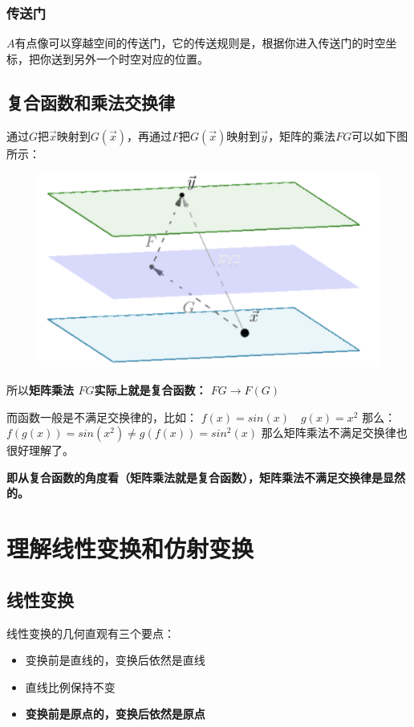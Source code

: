 \documentclass[12pt]{article}
\begin{document}
\subsubsection{传送门}
$A$有点像可以穿越空间的传送门，它的传送规则是，根据你进入传送门的时空坐标，把你送到另外一个时空对应的位置。

\subsection{复合函数和乘法交换律}
通过$G$把$\vec{x}$映射到$G(\vec{x})$，再通过$F$把$G(\vec{x})$映射到$\vec{y}$，矩阵的乘法$FG$可以如下图所示：
\begin{figure}[H]
\centering
\includegraphics[width=.8\textwidth]{fig/UnderstandMatrixMultiplication_9.png}
\end{figure}

所以\textbf{矩阵乘法 $FG$实际上就是复合函数：
$FG \rightarrow F(G)$}

而函数一般是不满足交换律的，比如：
$f(x)=sin(x)\quad g(x)=x^2$
那么：
$f(g(x))=sin(x^2)\ne g(f(x))=sin^2(x)$
那么矩阵乘法不满足交换律也很好理解了。

\textbf{即从复合函数的角度看（矩阵乘法就是复合函数），矩阵乘法不满足交换律是显然的。}

\section{理解线性变换和仿射变换\cite{How_To_Understand_Affine_Transformation}}
\subsection{线性变换}
线性变换的几何直观有三个要点：
\begin{itemize}
    \item 变换前是直线的，变换后依然是直线
    \item 直线比例保持不变
    \item \textbf{变换前是原点的，变换后依然是原点}
\end{itemize}
\end{document}
